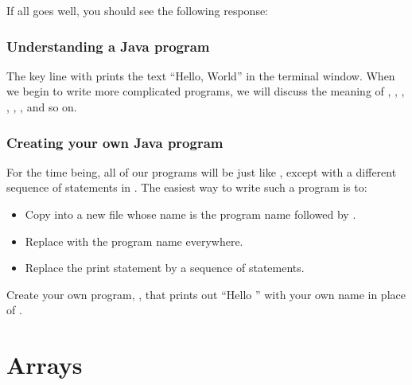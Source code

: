 \documentclass[letterpaper,10pt,english,openany,oneside]{sphinxmanual}
\begin{document}
If all goes well, you should see the following response:

\begin{sphinxVerbatim}[commandchars=\\\{\}]
 
\end{sphinxVerbatim}


\subsubsection{Understanding a Java program}
\label{\detokenize{introduction:understanding-a-java-program}}
The key line with  prints the text “Hello, World” in the terminal window. When we begin to write more complicated programs, we will discuss the meaning of , , , , , , and so on.


\subsubsection{Creating your own Java program}
\label{\detokenize{introduction:creating-your-own-java-program}}
For the time being, all of our programs will be just like , except with a different sequence of statements in . The easiest way to write such a program is to:
\begin{itemize}
\item {} 
Copy  into a new file whose name is the program name followed by .

\item {} 
Replace  with the program name everywhere.

\item {} 
Replace the print statement by a sequence of statements.

\end{itemize}

Create your own program, , that prints out “Hello ” with your own name in place of .


\section{Arrays}
\label{\detokenize{arrays-arraylists:arrays}}\label{\detokenize{arrays-arraylists::doc}}
\end{document}
